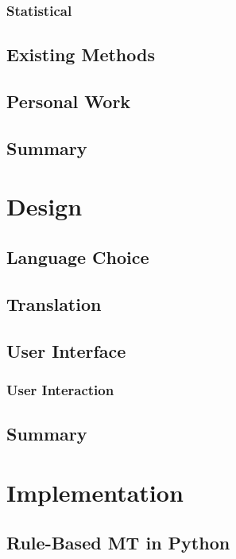 \documentclass[12pt]{ociamthesis}  %
\begin{document}
\subsection{Statistical}

\section{Existing Methods}
\label{existing methods}
\section{Personal Work}
\section{Summary}


\chapter{Design}

\section{Language Choice}
\section{Translation}
\section{User Interface}
	\subsection{User Interaction}
\section{Summary}


\chapter{Implementation}
\label{implementation}

\section{Rule-Based MT in Python}
\end{document}

